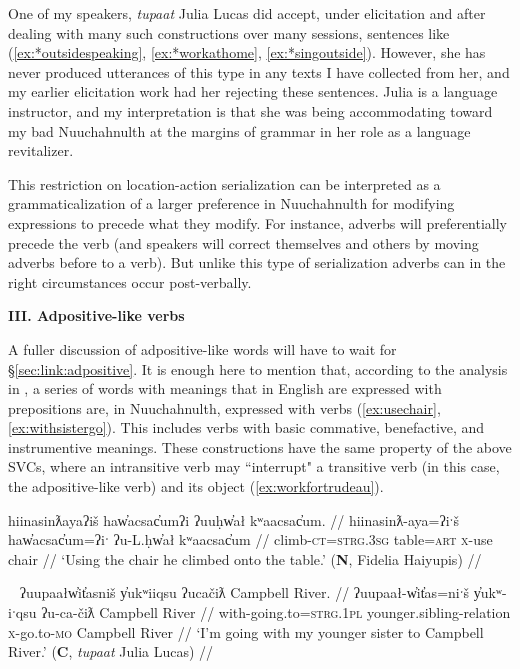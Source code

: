 One of my speakers, \textit{tupaat} Julia Lucas did accept, under elicitation and after dealing with many such constructions over many sessions, sentences like (\ref{ex:*outsidespeaking}, \ref{ex:*workathome}, \ref{ex:*singoutside}). However, she has never produced utterances of this type in any texts I have collected from her, and my earlier elicitation work had her rejecting these sentences. Julia is a language instructor, and my interpretation is that she was being accommodating toward my bad Nuuchahnulth at the margins of grammar in her role as a language revitalizer.

This restriction on location-action serialization can be interpreted as a grammaticalization of a larger preference in Nuuchahnulth for modifying expressions to precede what they modify. For instance, adverbs will preferentially precede the verb (and speakers will correct themselves and others by moving adverbs before to a verb). But unlike this type of serialization adverbs can in the right circumstances occur post-verbally.

\vspace{10pt}

\noindent \textbf{III. Adpositive-like verbs}

\vspace{10pt}

A fuller discussion of adpositive-like words will have to wait for \S\ref{sec:link:adpositive}. It is enough here to mention that, according to the analysis in \citep{woo2007b}, a series of words with meanings that in English are expressed with prepositions are, in Nuuchahnulth, expressed with verbs (\ref{ex:usechair}, \ref{ex:withsistergo}). This includes verbs with basic commative, benefactive, and instrumentive meanings. These constructions have the same property of the above SVCs, where an intransitive verb may ``interrupt" a transitive verb (in this case, the adpositive-like verb) and its object (\ref{ex:workfortrudeau}).


\ex \label{ex:usechair}
\begingl
\glpreamble hiinasinƛayaʔiš haw̓acsac̓umʔi ʔuuḥw̓ał kʷaacsac̓um. //
\gla hiinasinƛ-aya=ʔiˑš haw̓acsac̓um=ʔiˑ ʔu-L.ḥw̓ał kʷaacsac̓um //
\glb climb-\textsc{ct}=\textsc{strg.3sg} table=\textsc{art} \textsc{x}-use chair //
\glft `Using the chair he climbed onto the table.' (\textbf{N}, Fidelia Haiyupis) //
\endgl
\xe

\ex~ \label{ex:withsistergo}
\begingl
\glpreamble ʔuupaałw̓it̓asniš y̓ukʷiiqsu ʔucačiƛ Campbell River. //
\gla ʔuupaał-w̓it̓as=niˑš y̓ukʷ-iˑqsu ʔu-ca-čiƛ Campbell River //
\glb with-going.to=\textsc{strg.1pl} younger.sibling-relation \textsc{x}-go.to-\textsc{mo} Campbell River //
\glft `I'm going with my younger sister to Campbell River.' (\textbf{C}, \textit{tupaat} Julia Lucas) //
\endgl
\xe

